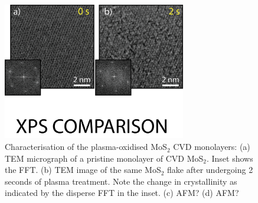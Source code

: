 \documentclass[%
 reprint,
superscriptaddress,
 amsmath,amssymb,
 aps,
prb,
]{revtex4-1}
\begin{document}
\begin{center}
\begin{figure}[!htb]
\includegraphics[width=80mm]{Figure_4_photo}
\caption{Characterisation of the plasma-oxidised MoS$_2$ CVD monolayers: (a) TEM micrograph of a pristine monolayer of CVD MoS$_2$. Inset shows the FFT. (b) TEM image of the same MoS$_2$ flake after undergoing 2 seconds of plasma treatment. Note the change in crystallinity as indicated by the disperse FFT in the inset. (c) AFM? (d) AFM?}
\end{figure}
\end{center}
\end{document}
